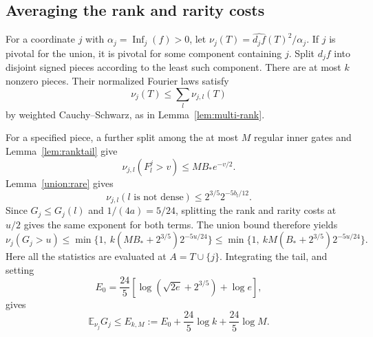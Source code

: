 \documentclass[11pt]{amsart}
\theoremstyle{definition}
\theoremstyle{remark}
\newcommand{\E}{\mathbb E}
\DeclareMathOperator{\Inf}{Inf}
\newcommand{\wh}[1]{\widehat{#1}}
\begin{document}
\subsection{Averaging the rank and rarity costs}

For a coordinate $j$ with $\alpha_j=\Inf_j(f)>0$, let
$\nu_j(T)=\wh{d_jf}(T)^2/\alpha_j$.
If $j$ is pivotal for the union, it is pivotal for some component containing $j$.
Split $d_jf$ into disjoint signed pieces according to the least such component.
There are at most $k$ nonzero pieces.
Their normalized Fourier laws satisfy
\[
 \nu_j(T)\le\sum_l\nu_{j,l}(T)
\]
by weighted Cauchy--Schwarz, as in Lemma~\ref{lem:multi-rank}.

For a specified piece, a further split among the at most $M$ regular inner gates and Lemma~\ref{lem:ranktail} give
\[
 \nu_{j,l}(F_l^j>v)\le MB_*e^{-v/2}.
\]
Lemma~\ref{union:rare} gives
\[
 \nu_{j,l}(l\text{ is not dense})\le2^{3/5}2^{-5b_l/12}.
\]
Since $G_j\le G_j(l)$ and $1/(4a)=5/24$, splitting the rank and rarity costs at $u/2$ gives the same exponent for both terms. The union bound therefore yields
\begin{equation}\label{union:Gtail}
 \nu_j(G_j>u)
 \le\min\{1,\ k(MB_*+2^{3/5})2^{-5u/24}\}
 \le\min\{1,\ kM(B_*+2^{3/5})2^{-5u/24}\}.
\end{equation}
Here all the statistics are evaluated at $A=T\cup\{j\}$.
Integrating the tail, and setting
\begin{equation}\label{union:E0}
 E_0=\frac{24}{5}\left[\log(\sqrt{2e}+2^{3/5})+\log e\right],
\end{equation}
gives
\begin{equation}\label{union:Gmean}
 \E_{\nu_j}G_j\le E_{k,M}:=E_0+\frac{24}{5}\log k+\frac{24}{5}\log M.
\end{equation}
\end{document}
